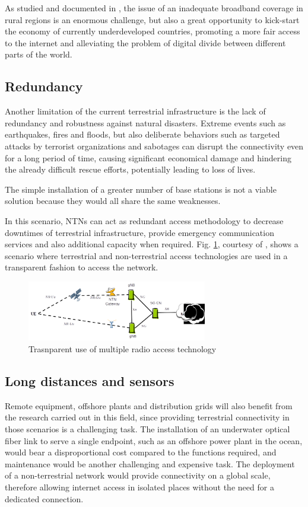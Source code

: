 As studied and documented in \cite{6g-challenge-opportunity-base-pyramid}, the issue of an inadequate broadband coverage in rural regions is an enormous challenge, but also a great opportunity to kick-start the economy of currently underdeveloped countries, promoting a more fair access to the internet and alleviating the problem of digital divide between different parts of the world.

\subsection{Redundancy}
Another limitation of the current terrestrial infrastructure is the lack of redundancy and robustness against natural disasters. Extreme events such as earthquakes, fires and floods, but also deliberate behaviors such as targeted attacks by terrorist organizations and sabotages can disrupt the connectivity even for a long period of time, causing significant economical damage and hindering the already difficult rescue efforts, potentially leading to loss of lives.

The simple installation of a greater number of base stations is not a viable solution because they would all share the same weaknesses.

In this scenario, \ac{NTNs} can act as redundant access methodology to decrease downtimes of terrestrial infrastructure, provide emergency communication services and also additional capacity when required.
Fig. \ref{fig:multiple-connectivity}, courtesy of \cite{3gpp-tr-38.811}, shows a scenario where terrestrial and non-terrestrial access technologies are used in a transparent fashion to access the network. 

\begin{figure}[ht]
    \centering
    \includegraphics[width=0.7\textwidth]{res/multiple-connectivity.png}
    \caption{Trasnparent use of multiple radio access technology \cite{3gpp-tr-38.811}}
    \label{fig:multiple-connectivity}
\end{figure}

\subsection{Long distances and sensors}
Remote equipment, offshore plants and distribution grids will also benefit from the research carried out in this field, since providing terrestrial connectivity in those scenarios is a challenging task. The installation of an underwater optical fiber link to serve a single endpoint, such as an offshore power plant in the ocean, would bear a disproportional cost compared to the functions required, and maintenance would be another challenging and expensive task. 
The deployment of a non-terrestrial network would provide connectivity on a global scale, therefore allowing internet access in isolated places without the need for a dedicated connection.

